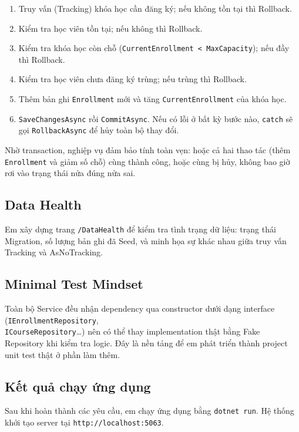 \begin{enumerate}[leftmargin = 0.7cm, label = \textbf{Bước \arabic*:}]
    \item Truy vấn (Tracking) khóa học cần đăng ký; nếu không tồn tại thì Rollback.
    \item Kiểm tra học viên tồn tại; nếu không thì Rollback.
    \item Kiểm tra khóa học còn chỗ (\texttt{CurrentEnrollment < MaxCapacity}); nếu đầy thì Rollback.
    \item Kiểm tra học viên chưa đăng ký trùng; nếu trùng thì Rollback.
    \item Thêm bản ghi \texttt{Enrollment} mới và tăng \texttt{CurrentEnrollment} của khóa học.
    \item \texttt{SaveChangesAsync} rồi \texttt{CommitAsync}. Nếu có lỗi ở bất kỳ bước nào, \texttt{catch} sẽ gọi \texttt{RollbackAsync} để hủy toàn bộ thay đổi.
\end{enumerate}

Nhờ transaction, nghiệp vụ đảm bảo tính toàn vẹn: hoặc cả hai thao tác (thêm \texttt{Enrollment} và giảm số chỗ) cùng thành công, hoặc cùng bị hủy, không bao giờ rơi vào trạng thái nửa đúng nửa sai.

\subsection{Data Health}

Em xây dựng trang \texttt{/DataHealth} để kiểm tra tình trạng dữ liệu: trạng thái Migration, số lượng bản ghi đã Seed, và minh họa sự khác nhau giữa truy vấn Tracking và AsNoTracking.

\subsection{Minimal Test Mindset}

Toàn bộ Service đều nhận dependency qua constructor dưới dạng interface (\texttt{IEnrollmentRepository}, \\ \texttt{ICourseRepository}\dots) nên có thể thay implementation thật bằng Fake Repository khi kiểm tra logic. Đây là nền tảng để em phát triển thành project unit test thật ở phần làm thêm.

\subsection{Kết quả chạy ứng dụng}

Sau khi hoàn thành các yêu cầu, em chạy ứng dụng bằng \texttt{dotnet run}. Hệ thống khởi tạo server tại \texttt{http://localhost:5063}.

